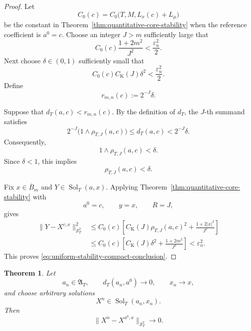 \documentclass[12pt,oneside, reqno]{amsart}
\newtheorem{theorem}{Theorem}[section]
\numberwithin{equation}{section}
\begin{document}
	\begin{proof}
		Let
		\[
		C_0(c)=C_0\bigl(T,M,L_x(c)+L_\mu\bigr)
		\]
		be the constant in
		Theorem~\ref{thm:quantitative-core-stability} when the reference
		coefficient is $a^0=c$. Choose an integer $J>m$ sufficiently large
		that
		\begin{equation}
			\label{eq:uniform-stability-tail-choice}
			C_0(c)\frac{1+2m^2}{J^2}
			<
			\frac{\varepsilon_n^2}{2}.
		\end{equation}
		Next choose $\delta\in(0,1)$ sufficiently small that
		\begin{equation}
			\label{eq:uniform-stability-local-choice}
			C_0(c)C_{\mathrm K}(J)\delta^2
			<
			\frac{\varepsilon_n^2}{2}.
		\end{equation}
		Define
		\begin{equation}
			\label{eq:uniform-stability-radius}
			r_{m,n}(c):=2^{-J}\delta.
		\end{equation}
		
		Suppose that $d_T(a,c)<r_{m,n}(c)$. By the definition of $d_T$,
		the $J$-th summand satisfies
		\[
		2^{-J}\bigl(1\wedge\rho_{T,J}(a,c)\bigr)
		\leq
		d_T(a,c)
		<
		2^{-J}\delta.
		\]
		Consequently,
		\[
		1\wedge\rho_{T,J}(a,c)<\delta.
		\]
		Since $\delta<1$, this implies
		\begin{equation}
			\label{eq:uniform-stability-local-distance}
			\rho_{T,J}(a,c)<\delta.
		\end{equation}
		
		Fix $x\in\overline B_m$ and
		$Y\in\operatorname{Sol}_T(a,x)$. Applying
		Theorem~\ref{thm:quantitative-core-stability} with
		\[
		a^0=c,
		\qquad
		y=x,
		\qquad
		R=J,
		\]
		gives
		\[
		\begin{aligned}
			\|Y-X^{c,x}\|_{\mathcal S_T^2}^2
			&\leq
			C_0(c)
			\left[
			C_{\mathrm K}(J)\rho_{T,J}(a,c)^2
			+
			\frac{1+2|x|^2}{J^2}
			\right]
			\\
			&\leq
			C_0(c)
			\left[
			C_{\mathrm K}(J)\delta^2
			+
			\frac{1+2m^2}{J^2}
			\right]
			<
			\varepsilon_n^2.
		\end{aligned}
		\]
		This proves \eqref{eq:uniform-stability-compact-conclusion}.
	\end{proof}
	
	\begin{theorem}
		\label{thm:sequential-core-stability}
		Let
		\[
		a_n\in\mathfrak A_T,
		\qquad
		d_T(a_n,a^0)\longrightarrow0,
		\qquad
		x_n\longrightarrow x,
		\]
		and choose arbitrary solutions
		\[
		X^n\in\operatorname{Sol}_T(a_n,x_n).
		\]
		Then
		\begin{equation}
			\label{eq:sequential-core-convergence}
			\|X^n-X^{a^0,x}\|_{\mathcal S_T^2}
			\longrightarrow0.
		\end{equation}
	\end{theorem}
	
\end{document}
